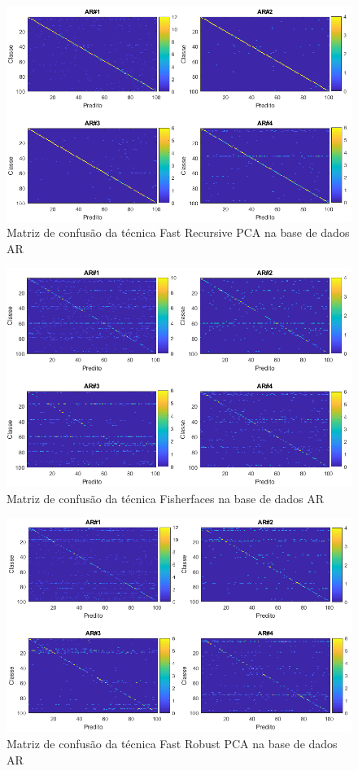 \begin{figure}[H]
\caption{Matriz de confusão da técnica Fast Recursive PCA na base de dados AR}
\centering
\includegraphics[scale = 0.65]{imgs4/matrizes_confusao/FastRecPCA}
\end{figure}

\begin{figure}[H]
\caption{Matriz de confusão da técnica Fisherfaces na base de dados AR}
\centering
\includegraphics[scale = 0.65]{imgs4/matrizes_confusao/fisherfaces}
\end{figure}


\begin{figure}[H]
\caption{Matriz de confusão da técnica Fast Robust PCA na base de dados AR}
\centering
\includegraphics[scale = 0.65]{imgs4/matrizes_confusao/FRPCA}
\end{figure}

